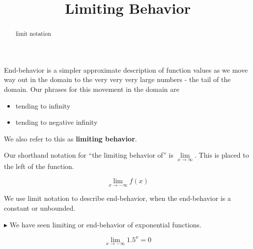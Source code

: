 \documentclass{ximera}
\title{Limiting Behavior}
\begin{document}
\begin{abstract}
limit notation
\end{abstract}
\maketitle




End-behavior is a simpler approximate description of function values as we move way out in the domain to the very very very large numbers - the tail of the domain.  Our phrases for this movement in the domain are 

\begin{itemize}
\item tending to infinity
\item tending to negative infinity
\end{itemize}


We also refer to this as \textbf{limiting behavior}. 


Our shorthand notation for ``the limiting behavior of'' is $\lim\limits_{x \to \infty}$.  This is placed to the left of the function. 


\[   \lim_{x \to -\infty} f(x)     \]



We use limit notation to describe end-behavior, when the end-behavior is a constant or unbounded.






$\blacktriangleright$  We have seen limiting or end-behavior of exponential functions.


\[   \lim_{x \to -\infty} 1.5^x   = 0      \]


\begin{image}
\end{image}
\end{document}
